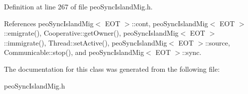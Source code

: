 Definition at line 267 of file peo\-Sync\-Island\-Mig.h.

References peo\-Sync\-Island\-Mig$<$ EOT $>$::cont, peo\-Sync\-Island\-Mig$<$ EOT $>$::emigrate(), Cooperative::get\-Owner(), peo\-Sync\-Island\-Mig$<$ EOT $>$::immigrate(), Thread::set\-Active(), peo\-Sync\-Island\-Mig$<$ EOT $>$::source, Communicable::stop(), and peo\-Sync\-Island\-Mig$<$ EOT $>$::sync.

The documentation for this class was generated from the following file:\begin{CompactItemize}
\item 
peo\-Sync\-Island\-Mig.h\end{CompactItemize}
